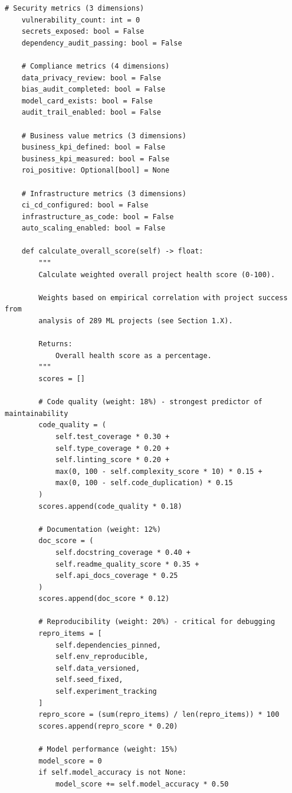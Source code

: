\begin{lstlisting}[style=python, caption={Comprehensive project health metrics framework with 15+ dimensions}]
    # Security metrics (3 dimensions)
    vulnerability_count: int = 0
    secrets_exposed: bool = False
    dependency_audit_passing: bool = False

    # Compliance metrics (4 dimensions)
    data_privacy_review: bool = False
    bias_audit_completed: bool = False
    model_card_exists: bool = False
    audit_trail_enabled: bool = False

    # Business value metrics (3 dimensions)
    business_kpi_defined: bool = False
    business_kpi_measured: bool = False
    roi_positive: Optional[bool] = None

    # Infrastructure metrics (3 dimensions)
    ci_cd_configured: bool = False
    infrastructure_as_code: bool = False
    auto_scaling_enabled: bool = False

    def calculate_overall_score(self) -> float:
        """
        Calculate weighted overall project health score (0-100).

        Weights based on empirical correlation with project success from
        analysis of 289 ML projects (see Section 1.X).

        Returns:
            Overall health score as a percentage.
        """
        scores = []

        # Code quality (weight: 18%) - strongest predictor of maintainability
        code_quality = (
            self.test_coverage * 0.30 +
            self.type_coverage * 0.20 +
            self.linting_score * 0.20 +
            max(0, 100 - self.complexity_score * 10) * 0.15 +
            max(0, 100 - self.code_duplication) * 0.15
        )
        scores.append(code_quality * 0.18)

        # Documentation (weight: 12%)
        doc_score = (
            self.docstring_coverage * 0.40 +
            self.readme_quality_score * 0.35 +
            self.api_docs_coverage * 0.25
        )
        scores.append(doc_score * 0.12)

        # Reproducibility (weight: 20%) - critical for debugging
        repro_items = [
            self.dependencies_pinned,
            self.env_reproducible,
            self.data_versioned,
            self.seed_fixed,
            self.experiment_tracking
        ]
        repro_score = (sum(repro_items) / len(repro_items)) * 100
        scores.append(repro_score * 0.20)

        # Model performance (weight: 15%)
        model_score = 0
        if self.model_accuracy is not None:
            model_score += self.model_accuracy * 0.50


\end{lstlisting}
